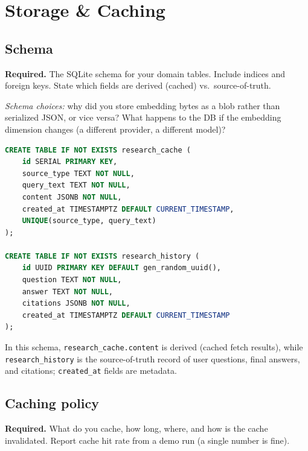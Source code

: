 \documentclass[11pt,a4paper]{article}
\begin{document}
\section{Storage \& Caching}\label{sec:storage}

\subsection{Schema}

\begin{deliverbox}
\textbf{Required.} The SQLite schema for your domain tables. Include indices and foreign keys. State which fields are derived (cached) vs.\ source-of-truth.
\end{deliverbox}

\begin{probebox}
\textit{Schema choices:} why did you store embedding bytes as a blob rather than serialized JSON, or vice versa? What happens to the DB if the embedding dimension changes (a different provider, a different model)?
\end{probebox}

\begin{lstlisting}[style=python,language=sql,numbers=none,basicstyle=\ttfamily\small]
CREATE TABLE IF NOT EXISTS research_cache (
    id SERIAL PRIMARY KEY,
    source_type TEXT NOT NULL,
    query_text TEXT NOT NULL,
    content JSONB NOT NULL,
    created_at TIMESTAMPTZ DEFAULT CURRENT_TIMESTAMP,
    UNIQUE(source_type, query_text)
);

CREATE TABLE IF NOT EXISTS research_history (
    id UUID PRIMARY KEY DEFAULT gen_random_uuid(),
    question TEXT NOT NULL,
    answer TEXT NOT NULL,
    citations JSONB NOT NULL,
    created_at TIMESTAMPTZ DEFAULT CURRENT_TIMESTAMP
);
\end{lstlisting}

In this schema, \texttt{research\_cache.content} is derived (cached fetch results), while \texttt{research\_history} is the source-of-truth record of user questions, final answers, and citations; \texttt{created\_at} fields are metadata.

\subsection{Caching policy}

\begin{deliverbox}
\textbf{Required.} What do you cache, how long, where, and how is the cache invalidated. Report cache hit rate from a demo run (a single number is fine).
\end{deliverbox}
\end{document}
